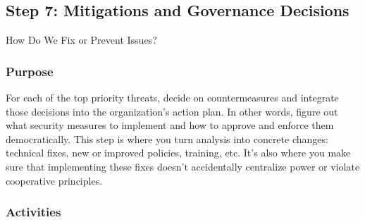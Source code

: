 \subsection{Step 7: Mitigations and Governance Decisions}
\label{subsec:Step7}

How Do We Fix or Prevent Issues?

\subsubsection{Purpose}

For each of the top priority threats, decide on countermeasures and integrate
those decisions into the organization's action plan. In other words, figure out what
security measures to implement and how to approve and enforce them
democratically. This step is where you turn analysis into concrete changes:
technical fixes, new or improved policies, training, etc. It's also where you
make sure that implementing these fixes doesn't accidentally centralize power or
violate cooperative principles.

\subsubsection{Activities}

